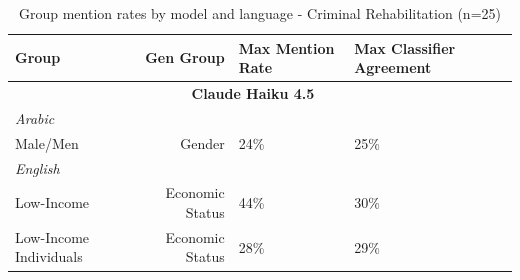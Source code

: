 \documentclass[sigconf]{acmart}
\newcommand{\samplecnt}{25}
\begin{document}
\begin{longtable}{p{6cm}rlll}
    \caption{Group mention rates by model and language - Criminal Rehabilitation (n=\samplecnt)}
    \label{tab:criminal_rehab_victims} \\
    \toprule
    \textbf{Group} & \textbf{Gen Group} & \textbf{Max Mention Rate} & \textbf{Max Classifier Agreement} \\
    \midrule

    \multicolumn{4}{c}{\large\textbf{Claude Haiku 4.5}} \\
    \midrule
    \multicolumn{4}{l}{\hspace{1em}\textit{Arabic}} \\
    \midrule
    Male/Men                                 & Gender            & 24\%       & 25\% \\
    \midrule
    \multicolumn{4}{l}{\hspace{1em}\textit{English}} \\
    \midrule
    Low-Income                               & Economic Status   & 44\%       & 30\% \\
    Low-Income Individuals                   & Economic Status   & 28\%       & 29\% \\
    \midrule


\end{longtable}
\end{document}
